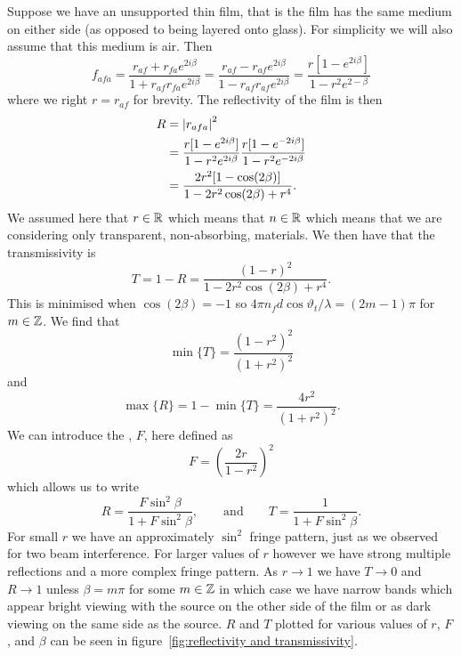     Suppose we have an unsupported thin film, that is the film has the same medium on either side (as opposed to being layered onto glass).
    For simplicity we will also assume that this medium is air.
    Then
    \[f_{afa} = \frac{r_{af} + r_{fa}e^{2i\beta}}{1 + r_{af}r_{fa}e^{2i\beta}} = \frac{r_{af} - r_{af}e^{2i\beta}}{1 - r_{af}r_{af}e^{2i\beta}} = \frac{r[1 - e^{2i\beta}]}{1 - r^2e^{2-\beta}}\]
    where we right \(r = r_{af}\) for brevity.
    The reflectivity of the film is then
    \begin{align*}
        R &= \abs{r_{afa}}^2\\
        &= \frac{r[1 - e^{2i\beta}]}{1 - r^2e^{2i\beta}}\frac{r[1 - e^{-2i\beta}]}{1 - r^2e^{-2i\beta}}\\
        &= \frac{2r^2[1 - \cos(2\beta)]}{1 - 2r^2\cos(2\beta) + r^4}.
    \end{align*}
    We assumed here that \(r\in\mathbb{R}\) which means that \(n\in\mathbb{R}\) which means that we are considering only transparent, non-absorbing, materials.
    We then have that the transmissivity is
    \[T = 1 - R = \frac{(1 - r)^2}{1 - 2r^2\cos(2\beta) + r^4}.\]
    This is minimised when \(\cos(2\beta) = -1\) so \(4\pi n_fd\cos\vartheta_t/\lambda = (2m - 1)\pi\) for \(m\in\mathbb{Z}\).
    We find that
    \[\min\{T\} = \frac{(1 - r^2)^2}{(1 + r^2)^2}\]
    and
    \[\max\{R\} = 1 - \min\{T\} = \frac{4r^2}{(1 + r^2)^2}.\]
    We can introduce the , \(F\), here defined as
    \[F = \left( \frac{2r}{1 - r^2} \right)^2\]
    which allows us to write
    \[R = \frac{F\sin^2\beta}{1 + F\sin^2\beta}, \qquad\text{and}\qquad T = \frac{1}{1 + F\sin^2\beta}.\]
    For small \(r\) we have an approximately \(\sin^2\) fringe pattern, just as we observed for two beam interference.
    For larger values of \(r\) however we have strong multiple reflections and a more complex fringe pattern.
    As \(r \to 1\) we have \(T \to 0\) and \(R \to 1\) unless \(\beta = m\pi\) for some \(m\in\mathbb{Z}\) in which case we have narrow bands which appear bright viewing with the source on the other side of the film or as dark viewing on the same side as the source.
    \(R\) and \(T\) plotted for various values of \(r\), \(F\), and \(\beta\) can be seen in figure~\ref{fig:reflectivity and transmissivity}.
    
